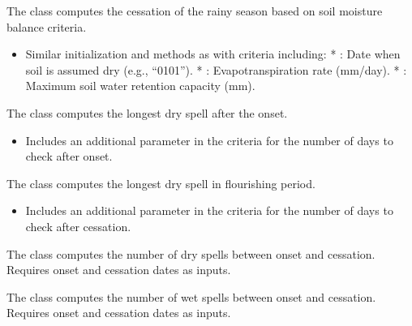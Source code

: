 \documentclass[letterpaper,10pt,english]{sphinxmanual}
\begin{document}
\sphinxAtStartPar
{}

\sphinxAtStartPar
The  class computes the cessation of the rainy season based on soil moisture balance criteria.
\begin{itemize}
\item {} 
\sphinxAtStartPar
Similar initialization and methods as  with criteria including:
* : Date when soil is assumed dry (e.g., “01\sphinxhyphen{}01”).
* : Evapotranspiration rate (mm/day).
* : Maximum soil water retention capacity (mm).

\end{itemize}

\sphinxAtStartPar
{}

\sphinxAtStartPar
The  class computes the longest dry spell after the onset.
\begin{itemize}
\item {} 
\sphinxAtStartPar
Includes an additional  parameter in the criteria for the number of days to check after onset.

\end{itemize}

\sphinxAtStartPar
The  class computes the longest dry spell in flourishing period.
\begin{itemize}
\item {} 
\sphinxAtStartPar
Includes an additional  parameter in the criteria for the number of days to check after cessation.

\end{itemize}

\sphinxAtStartPar
The  class computes the number of dry spells between onset and cessation. Requires onset and cessation dates as inputs.

\sphinxAtStartPar
{}

\sphinxAtStartPar
The  class computes the number of wet spells between onset and cessation. Requires onset and cessation dates as inputs.
\end{document}
